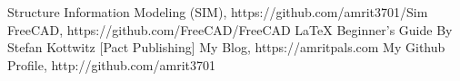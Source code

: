 \begin{thebibliography}{9}
\bibitem{} Structure Information Modeling (SIM), https://github.com/amrit3701/Sim
\bibitem{} FreeCAD, https://github.com/FreeCAD/FreeCAD
\bibitem{} \LaTeX{} Beginner's Guide By Stefan Kottwitz [Pact Publishing]
\bibitem{} My Blog, https://amritpals.com
\bibitem{} My Github Profile, http://github.com/amrit3701
\end{thebibliography}
